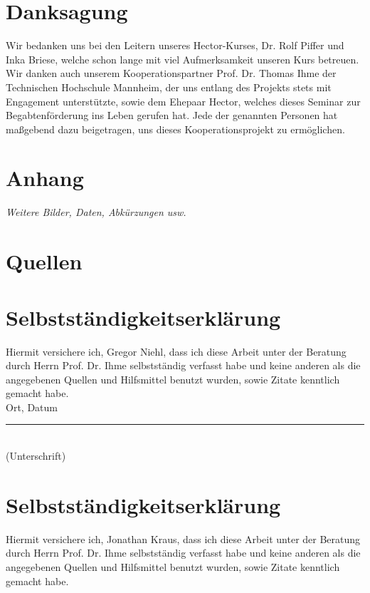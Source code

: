 \section*{Danksagung}

Wir bedanken uns bei den Leitern unseres Hector-Kurses, Dr. Rolf Piffer und Inka Briese, welche schon lange mit viel Aufmerksamkeit unseren Kurs betreuen. Wir danken auch unserem Kooperationspartner Prof. Dr. Thomas Ihme der Technischen Hochschule Mannheim, der uns entlang des Projekts stets mit Engagement unterstützte, sowie dem Ehepaar Hector, welches dieses Seminar zur Begabtenförderung ins Leben gerufen hat. Jede der genannten Personen hat maßgebend dazu beigetragen, uns dieses Kooperationsprojekt zu ermöglichen.

\section{Anhang}

\textit{Weitere Bilder, Daten, Abkürzungen usw.}

\section*{Quellen}
\bib
\appendix

\newpage
\section*{Selbstständigkeitserklärung}
Hiermit versichere ich, Gregor Niehl, dass ich diese Arbeit unter der Beratung durch Herrn Prof. Dr. Ihme selbstständig verfasst habe und keine anderen als die angegebenen Quellen und Hilfsmittel benutzt wurden, sowie Zitate kenntlich gemacht habe. \\[2cm]

Ort, Datum \hfill \rule{5cm}{0.4pt} \\
\hfill (Unterschrift)

\newpage
\section*{Selbstständigkeitserklärung}
Hiermit versichere ich, Jonathan Kraus, dass ich diese Arbeit unter der Beratung durch Herrn Prof. Dr. Ihme selbstständig verfasst habe und keine anderen als die angegebenen Quellen und Hilfsmittel benutzt wurden, sowie Zitate kenntlich gemacht habe. \\[2cm]

